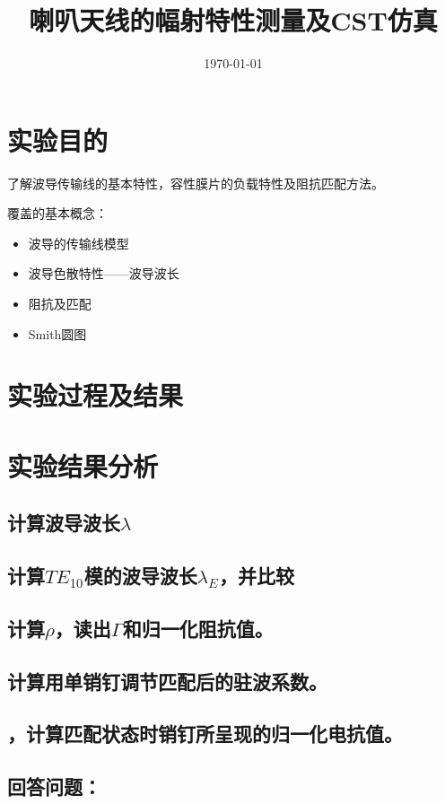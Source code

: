\documentclass{../source/Experiment}
\title{喇叭天线的幅射特性测量及CST仿真}
\date{\today}
\begin{document}
    \makecover
    \makeheader

    \section{实验目的}
    了解波导传输线的基本特性，容性膜片的负载特性及阻抗匹配方法。
    
    覆盖的基本概念：
    \begin{itemize}
        \item 波导的传输线模型
        \item 波导色散特性——波导波长
        \item 阻抗及匹配
        \item Smith圆图
    \end{itemize}

    \section{实验过程及结果}

    \section{实验结果分析}
        \subsection{计算波导波长$\lambda$}
        \subsection{计算$TE_{10}$模的波导波长$\lambda_E$，并比较}
        \subsection{计算$\rho $，读出$\Gamma $和归一化阻抗值。}
        \subsection{计算用单销钉调节匹配后的驻波系数。}
        \subsection{，计算匹配状态时销钉所呈现的归一化电抗值。}

        \subsection{回答问题：}
            \subsubsection{}
\end{document}
